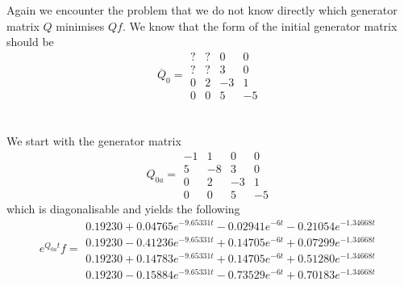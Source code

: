 \documentclass{article}
\begin{document}
Again we encounter the problem that we do not know directly which generator matrix $Q$ minimises $Qf$.
We know that the form of the initial generator matrix should be
\begin{equation*} 
 \overline{Q}_{0}= 
 \begin{array}{|rrrr|}
  ? & ? & 0 & 0 \\
  ? & ? & 3 & 0 \\
  0 & 2 & -3 & 1 \\
  0 & 0 & 5 & -5 
 \end{array}
 \end{equation*}\\\\
We start with the generator matrix 
\begin{equation*} 
 Q_{0a}= 
 \begin{array}{|rrrr|}
  -1 & 1 & 0 & 0 \\
  5 & -8 & 3 & 0 \\
  0 & 2 & -3 & 1 \\
  0 & 0 & 5 & -5 
 \end{array}
 \end{equation*}
which is diagonalisable and yields the following
\begin{equation*} 
 e^{Q_{0a}t}f= 
 \begin{array}{|r|}
  0.19230+0.04765e^{-9.65331t}- 0.02941e^{-6t}- 0.21054e^{-1.34668t}\\
  0.19230-0.41236e^{-9.65331t}+ 0.14705e^{-6t}+ 0.07299e^{-1.34668t}\\
  0.19230+0.14783e^{-9.65331t}+ 0.14705e^{-6t}+ 0.51280e^{-1.34668t}\\
  0.19230-0.15884e^{-9.65331t}- 0.73529e^{-6t}+ 0.70183e^{-1.34668t}  
 \end{array}
 \end{equation*}
\end{document}
